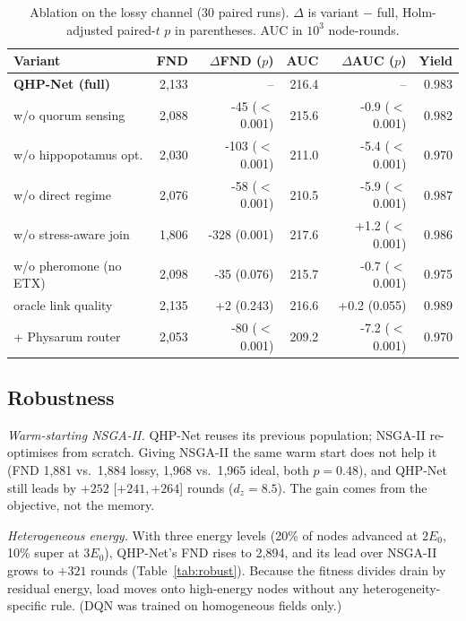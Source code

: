 \documentclass[conference]{IEEEtran}
\begin{document}
\begin{table}[t]
\caption{Ablation on the lossy channel (30 paired runs). $\Delta$ is variant $-$ full, Holm-adjusted paired-$t$ $p$ in parentheses. AUC in $10^3$ node-rounds.}
\label{tab:abl}
\centering\footnotesize
\setlength{\tabcolsep}{2.4pt}
\begin{tabular}{@{}lrrrrr@{}}
\toprule
Variant & FND & $\Delta$FND ($p$) & AUC & $\Delta$AUC ($p$) & Yield\\
\midrule
\textbf{QHP-Net (full)} & 2,133 & -- & 216.4 & -- & 0.983 \\
w/o quorum sensing & 2,088 & -45 ($<$0.001) & 215.6 & -0.9 ($<$0.001) & 0.982 \\
w/o hippopotamus opt. & 2,030 & -103 ($<$0.001) & 211.0 & -5.4 ($<$0.001) & 0.970 \\
w/o direct regime & 2,076 & -58 ($<$0.001) & 210.5 & -5.9 ($<$0.001) & 0.987 \\
w/o stress-aware join & 1,806 & -328 (0.001) & 217.6 & +1.2 ($<$0.001) & 0.986 \\
w/o pheromone (no ETX) & 2,098 & -35 (0.076) & 215.7 & -0.7 ($<$0.001) & 0.975 \\
oracle link quality & 2,135 & +2 (0.243) & 216.6 & +0.2 (0.055) & 0.989 \\
+ Physarum router & 2,053 & -80 ($<$0.001) & 209.2 & -7.2 ($<$0.001) & 0.970 \\
\bottomrule
\end{tabular}
\end{table}

\subsection{Robustness}\label{sec:robust}
\emph{Warm-starting NSGA-II.} QHP-Net reuses its previous population; NSGA-II re-optimises from scratch. Giving NSGA-II the same warm start does not help it (FND 1,881 vs.\ 1,884 lossy, 1,968 vs.\ 1,965 ideal, both $p=0.48$), and QHP-Net still leads by $+252$ [$+241,+264$] rounds ($d_z=8.5$). The gain comes from the objective, not the memory.

\emph{Heterogeneous energy.} With three energy levels (20\% of nodes advanced at $2E_0$, 10\% super at $3E_0$), QHP-Net's FND rises to 2,894, and its lead over NSGA-II grows to $+321$ rounds (Table~\ref{tab:robust}). Because the fitness divides drain by residual energy, load moves onto high-energy nodes without any heterogeneity-specific rule. (DQN was trained on homogeneous fields only.)
\end{document}
